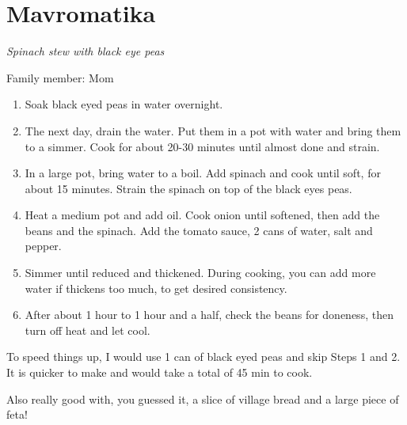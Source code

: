 \chapter{Mavromatika}
\label{ch:mavromatika}


\textit{Spinach stew with black eye peas}

Family member: Mom

\begin{enumerate}
    \item Soak black eyed peas in water overnight.
    \item The next day, drain the water. Put them in a pot with water and bring them to a simmer. Cook for about 20-30 minutes until almost done and strain.
    \item In a large pot, bring water to a boil. Add spinach and cook until soft, for about 15 minutes. Strain the spinach on top of the black eyes peas.
    \item Heat a medium pot and add oil. Cook onion until softened, then add the beans and the spinach. Add the tomato sauce, 2 cans of water, salt and pepper.
    \item Simmer until reduced and thickened. During cooking, you can add more water if thickens too much, to get desired consistency.
    \item After about 1 hour to 1 hour and a half, check the beans for doneness, then turn off heat and let cool.
\end{enumerate}

To speed things up, I would use 1 can of black eyed peas and skip Steps 1 and 2. It is quicker to make and would take a total of 45 min to cook.

Also really good with, you guessed it, a slice of village bread and a large piece of feta!
